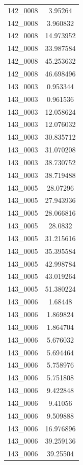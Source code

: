 \begin{table}[H]
\begin{tabular}{|c|c|}
        142\_0008 & 3.95264 \\
        142\_0008 & 3.960832 \\
        142\_0008 & 14.973952 \\
        142\_0008 & 33.987584 \\
        142\_0008 & 45.253632 \\
        142\_0008 & 46.698496 \\
        143\_0003 & 0.953344 \\
        143\_0003 & 0.961536 \\
        143\_0003 & 12.058624 \\
        143\_0003 & 12.076032 \\
        143\_0003 & 30.835712 \\
        143\_0003 & 31.070208 \\
        143\_0003 & 38.730752 \\
        143\_0003 & 38.719488 \\
        143\_0005 & 28.07296 \\
        143\_0005 & 27.943936 \\
        143\_0005 & 28.066816 \\
        143\_0005 & 28.0832 \\
        143\_0005 & 31.215616 \\
        143\_0005 & 35.395584 \\
        143\_0005 & 42.998784 \\
        143\_0005 & 43.019264 \\
        143\_0005 & 51.380224 \\
        143\_0006 & 1.68448 \\
        143\_0006 & 1.869824 \\
        143\_0006 & 1.864704 \\
        143\_0006 & 5.676032 \\
        143\_0006 & 5.694464 \\
        143\_0006 & 5.758976 \\
        143\_0006 & 5.751808 \\
        143\_0006 & 9.422848 \\
        143\_0006 & 9.41056 \\
        143\_0006 & 9.509888 \\
        143\_0006 & 16.976896 \\
        143\_0006 & 39.259136 \\
        143\_0006 & 39.25504 \\

\end{tabular}
\end{table}
